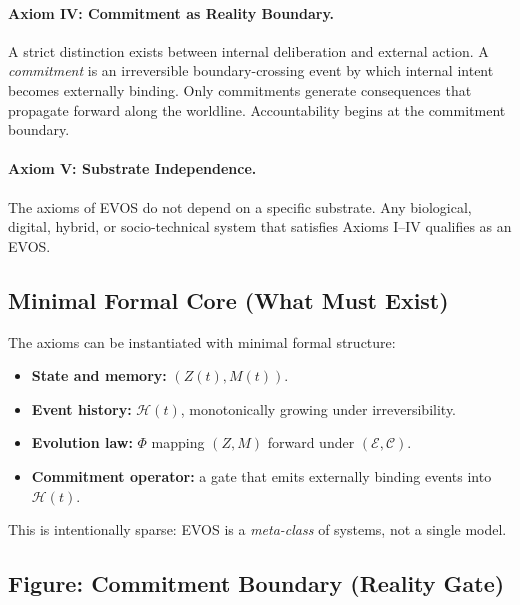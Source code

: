 \documentclass[11pt]{article}
\begin{document}
\paragraph{Axiom IV: Commitment as Reality Boundary.}
A strict distinction exists between internal deliberation and external action.
A \emph{commitment} is an irreversible boundary-crossing event by which internal intent
becomes externally binding. Only commitments generate consequences that propagate forward
along the worldline. Accountability begins at the commitment boundary.

\paragraph{Axiom V: Substrate Independence.}
The axioms of EVOS do not depend on a specific substrate. Any biological, digital, hybrid,
or socio-technical system that satisfies Axioms I--IV qualifies as an EVOS.

\vspace{0.75em}
\subsection{Minimal Formal Core (What Must Exist)}

The axioms can be instantiated with minimal formal structure:

\begin{itemize}
  \item \textbf{State and memory:} $(Z(t), M(t))$.
  \item \textbf{Event history:} $\mathcal{H}(t)$, monotonically growing under irreversibility.
  \item \textbf{Evolution law:} $\Phi$ mapping $(Z, M)$ forward under $(\mathcal{E},\mathcal{C})$.
  \item \textbf{Commitment operator:} a gate that emits externally binding events into $\mathcal{H}(t)$.
\end{itemize}

This is intentionally sparse: EVOS is a \emph{meta-class} of systems, not a single model.

\vspace{0.75em}
\subsection{Figure: Commitment Boundary (Reality Gate)}

\end{document}

